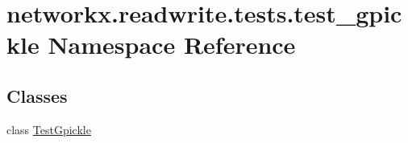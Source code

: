 \hypertarget{namespacenetworkx_1_1readwrite_1_1tests_1_1test__gpickle}{}\section{networkx.\+readwrite.\+tests.\+test\+\_\+gpickle Namespace Reference}
\label{namespacenetworkx_1_1readwrite_1_1tests_1_1test__gpickle}
\subsection*{Classes}
\begin{DoxyCompactItemize}
\item 
class \hyperlink{classnetworkx_1_1readwrite_1_1tests_1_1test__gpickle_1_1TestGpickle}{Test\+Gpickle}
\end{DoxyCompactItemize}
